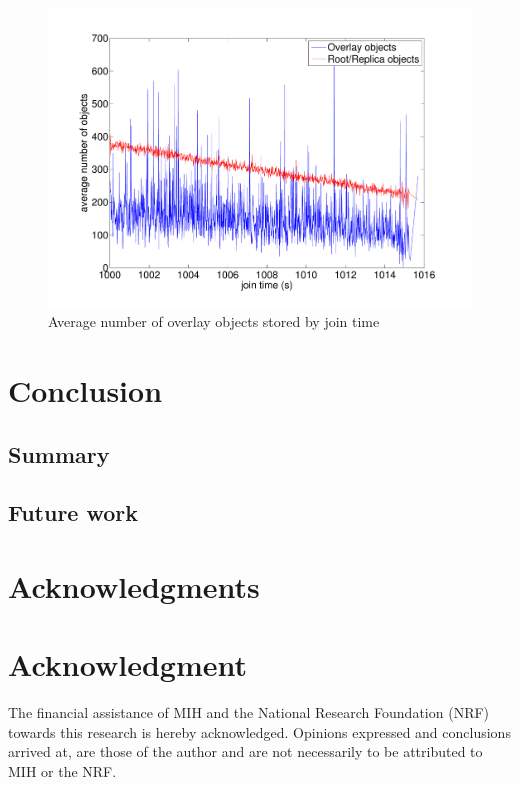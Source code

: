 \documentclass[10pt,a4paper,conference]{IEEEtran}
\begin{document}
\begin{figure}[htbp]
 \centering
 \includegraphics[clip=true, viewport=2cm 1cm 27.5cm 19.5cm, width=\columnwidth]{ObjectsByJoinTime}
 \caption{Average number of overlay objects stored by join time}
 \label{fig_pithos_response}
\end{figure}


\section{Conclusion}
\label{conclusion}

\subsection{Summary}

\subsection{Future work}


\ifCLASSOPTIONcompsoc
  \section*{Acknowledgments}
\else
  \section*{Acknowledgment}
\fi

The financial assistance of MIH and the National Research Foundation (NRF) towards this research is hereby acknowledged. Opinions expressed and
conclusions arrived at, are those of the author and are not necessarily to be attributed to MIH or the NRF.




\end{document}
